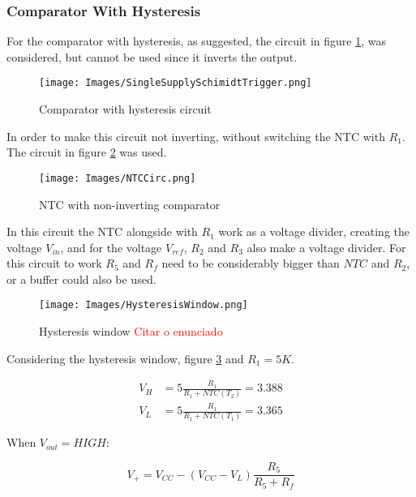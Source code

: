 \subsubsection{Comparator With Hysteresis}

For the comparator with hysteresis, as suggested, the circuit in figure \ref{fig:ComparatorCirc}, was considered, but cannot be used since it inverts the output.

\begin{figure}[H]
    \centering
    \texttt{[image: Images/SingleSupplySchimidtTrigger.png]}
    \caption{Comparator with hysteresis circuit \textsuperscript{\cite{NTC_datasheet}}}
    \label{fig:ComparatorCirc}
\end{figure}

In order to make this circuit not inverting, without switching the NTC with $R_{1}$. The circuit in figure \ref{fig:NTCCirc} was used.

\begin{figure}[H]
    \centering
    \texttt{[image: Images/NTCCirc.png]}
    \caption{NTC with non-inverting comparator}
    \label{fig:NTCCirc}
\end{figure}

In this circuit the NTC alongside with $R_1$ work as a voltage divider, creating the voltage $V_{in}$, and for the voltage $V_{ref}$, $R_2$ and $R_3$ also make a voltage divider. 
For this circuit to work $R_5$ and $R_f$ need to be considerably bigger than $NTC$ and $R_2$, or a buffer could also be used.

\begin{figure}[H]
    \centering
    \texttt{[image: Images/HysteresisWindow.png]}
    \caption{Hysteresis window \textcolor{red}{Citar o enunciado}}
    \label{fig:HysterWindow}
\end{figure}

Considering the hysteresis window, figure \ref{fig:HysterWindow} and $R_1 = 5K$.

\begin{equation}
    \begin{aligned}
        V_H &= 5\frac{R_1}{R_1 + NTC(T_2)} = 3.388\\
        V_L &= 5\frac{R_1}{R_1 + NTC(T_1)} = 3.365
    \end{aligned}
\end{equation}


When $V_{out} = HIGH$:

\begin{equation}
    V_+ = V_{CC}-\left (V_{CC}-V_L\right )\frac{R_5}{R_5 + R_f}
\end{equation}

